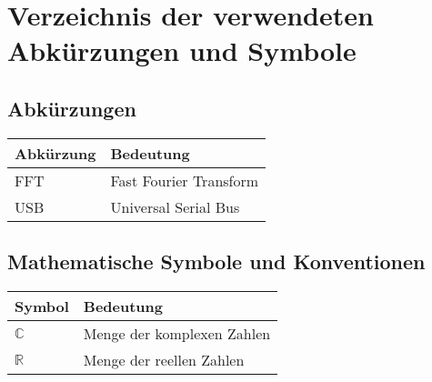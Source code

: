 \chapter{Verzeichnis der verwendeten Abkürzungen und Symbole}

\newlength{\ltfix}

\section*{Abkürzungen}
\setlength{\ltfix}{\dimexpr\textwidth-4\tabcolsep\relax}
\begin{longtable}{p{0.25\ltfix}p{0.75\ltfix}}
    \toprule
    \textbf{Abkürzung}  & \textbf{Bedeutung}\\
    \midrule \endhead%
    \midrule \endfoot%
    \bottomrule \endlastfoot%
    FFT         & Fast Fourier Transform\\
    USB         & Universal Serial Bus\\
\end{longtable}


\section*{Mathematische Symbole und Konventionen}
\begin{longtable}{p{0.25\ltfix}p{0.75\ltfix}}
    \toprule
    \textbf{Symbol} & \textbf{Bedeutung}\\
    \midrule \endhead%
    \midrule \endfoot%
    \bottomrule \endlastfoot%
    \(\mathbb{C}\)     & Menge der komplexen Zahlen\\
    \(\mathbb{R}\)     & Menge der reellen Zahlen\\
\end{longtable}


